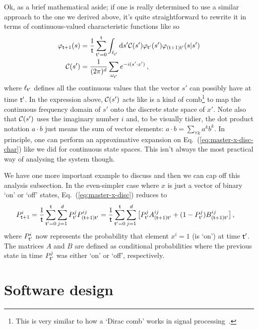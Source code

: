 \documentclass{book}
\begin{document}
Ok, as a brief mathematical aside; if one is really determined to use a similar approach to the one we derived above, it's quite straightforward to rewrite it in terms of continuous-valued characteristic functions like so
\begin{align}
\varphi_{{\sf t}+1}(s) &= \frac{1}{{\sf t}}\sum_{{\sf t}'=0}^{\sf t}\int_{\ell_{{\sf t}'}}{\rm d}s' {\cal C}(s') \varphi_{{\sf t}'}(s') \varphi_{({\sf t}+1){\sf t}'}(s \vert s') \label{eq:master-x-disc-char} \\
{\cal C}(s') &= \frac{1}{(2\pi )^d}\sum_{\omega_{{\sf t}'}}e^{-i(s'\cdot x')} \,,
\end{align}
where $\ell_{{\sf t}'}$ defines all the continuous values that the vector $s'$ can possibly have at time ${\sf t}'$. In the expression above, ${\cal C}(s')$ acts like is a kind of comb\footnote{This is very similar to how a `Dirac comb' works in signal processing~\cite{brandwood2012fourier}.} to map the continuous frequency domain of $s'$ onto the discrete state space of $x'$. Note also that ${\cal C}(s')$ uses the imaginary number $i$ and, to be visually tidier, the dot product notation $a\cdot b$ just means the sum of vector elements: $a\cdot b = \sum_{\forall k}a^kb^k$. In principle, one can perform an approximative expansion on Eq.~(\ref{eq:master-x-disc-char}) like we did for continuous state spaces. This isn't always the most practical way of analysing the system though. 

We have one more important example to discuss and then we can cap off this analysis subsection. In the even-simpler case where $x$ is just a vector of binary `on' or `off' states, Eq.~(\ref{eq:master-x-disc}) reduces to
\begin{align}
P^i_{{\sf t}+1} &= \frac{1}{{\sf t}}\sum_{{\sf t}'=0}^{\sf t} \sum_{j=1}^d P^j_{{\sf t}'} P^{ij}_{({\sf t}+1){\sf t}'} = \frac{1}{{\sf t}}\sum_{{\sf t}'=0}^{\sf t} \sum_{j=1}^d \big[ P^j_{{\sf t}'} A^{ij}_{({\sf t}+1){\sf t}'} + (1-P^j_{{\sf t}'}) B^{ij}_{({\sf t}+1){\sf t}'} \big] \label{eq:master-x-disc-binary}\,,
\end{align}
where $P^i_{{\sf t}'}$ now represents the probability that element $x^i=1$ (is `on') at time ${\sf t}'$. The matrices $A$ and $B$ are defined as conditional probabilities where the previous state in time $P^j_{{\sf t}'}$ was either `on' or `off', respectively.

\section{\sffamily Software design}
\end{document}
